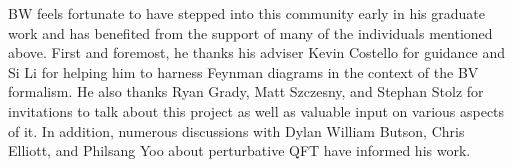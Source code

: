 BW feels fortunate to have stepped into this community early in his graduate work and has benefited from the support of many of the individuals mentioned above. 
First and foremost, he thanks his adviser Kevin Costello for guidance and Si Li for helping him to harness Feynman diagrams in the context of the BV formalism. 
He also thanks Ryan Grady, Matt Szczesny, and Stephan Stolz for invitations to talk about this project as well as valuable input on various aspects of it. 
In addition, numerous discussions with Dylan William Butson, Chris Elliott, and Philsang Yoo about perturbative QFT have informed his work. 
